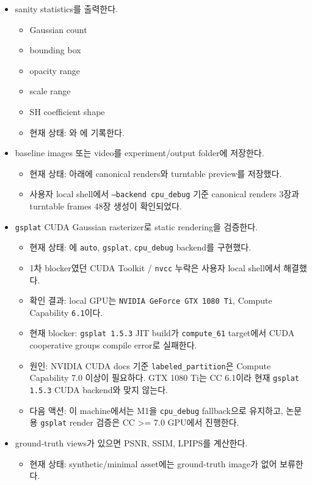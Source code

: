 \documentclass[10pt]{article}
\newcommand{\done}{\textcolor{DoneGreen}{\(\boxtimes\)}}
\newcommand{\blocked}{\textcolor{BlockRed}{[!]}}
\newcommand{\code}[1]{\texttt{#1}}
\begin{document}
\begin{itemize}
\begin{itemize}
      \item 현재 상태: 48-frame turntable PNG와 를 저장했다.
    \end{itemize}
  \item[\done] sanity statistics를 출력한다.
    \begin{itemize}
      \item Gaussian count
      \item bounding box
      \item opacity range
      \item scale range
      \item SH coefficient shape
      \item 현재 상태: 와 에 기록한다.
    \end{itemize}
  \item[\done] baseline images 또는 video를 experiment/output folder에 저장한다.
    \begin{itemize}
      \item 현재 상태:  아래에 canonical renders와 turntable preview를 저장했다.
      \item 사용자 local shell에서 \code{--backend cpu\_debug} 기준 canonical renders 3장과 turntable frames 48장 생성이 확인되었다.
    \end{itemize}
  \item[\blocked] \code{gsplat} CUDA Gaussian rasterizer로 static rendering을 검증한다.
    \begin{itemize}
      \item 현재 상태: 에 \code{auto}, \code{gsplat}, \code{cpu\_debug} backend를 구현했다.
      \item 1차 blocker였던 CUDA Toolkit / \code{nvcc} 누락은 사용자 local shell에서 해결했다.
      \item 확인 결과: local GPU는 \code{NVIDIA GeForce GTX 1080 Ti}, Compute Capability \code{6.1}이다.
      \item 현재 blocker: \code{gsplat 1.5.3} JIT build가 \code{compute\_61} target에서 CUDA cooperative groups compile error로 실패한다.
      \item 원인: NVIDIA CUDA docs 기준 \code{labeled\_partition}은 Compute Capability 7.0 이상이 필요하다. GTX 1080 Ti는 CC 6.1이라 현재 \code{gsplat 1.5.3} CUDA backend와 맞지 않는다.
      \item 다음 액션: 이 machine에서는 M1을 \code{cpu\_debug} fallback으로 유지하고, 논문용 \code{gsplat} render 검증은 CC >= 7.0 GPU에서 진행한다.
    \end{itemize}
  \item ground-truth views가 있으면 PSNR, SSIM, LPIPS를 계산한다.
    \begin{itemize}
      \item 현재 상태: synthetic/minimal asset에는 ground-truth image가 없어 보류한다.
    \end{itemize}
\end{itemize}
\end{document}
